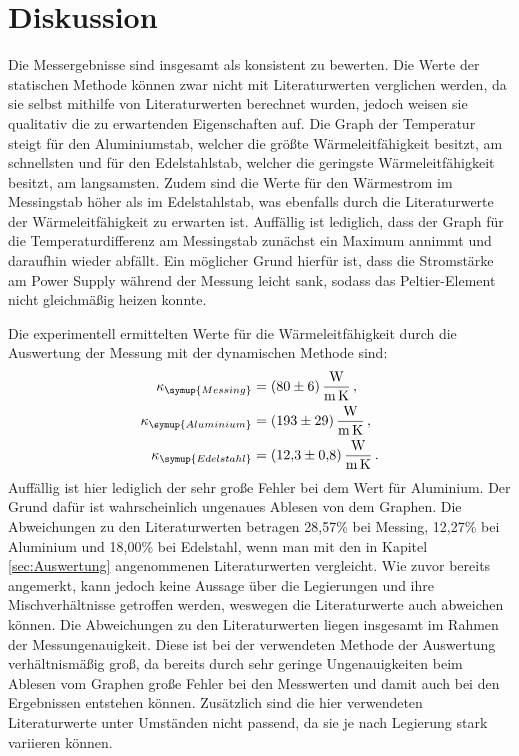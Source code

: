 \section{Diskussion}
\label{sec:Diskussion}
Die Messergebnisse sind insgesamt als konsistent zu bewerten.
Die Werte der statischen Methode können zwar nicht mit Literaturwerten verglichen werden,
da sie selbst mithilfe von Literaturwerten berechnet wurden, jedoch weisen sie
qualitativ die zu erwartenden Eigenschaften auf. Die Graph der Temperatur steigt für
den Aluminiumstab, welcher die größte Wärmeleitfähigkeit besitzt, am schnellsten und
für den Edelstahlstab, welcher die geringste Wärmeleitfähigkeit besitzt, am langsamsten.
Zudem sind die Werte für den Wärmestrom im Messingstab höher als im Edelstahlstab,
was ebenfalls durch die Literaturwerte der Wärmeleitfähigkeit zu erwarten ist.
Auffällig ist lediglich, dass der Graph für die Temperaturdifferenz am Messingstab
zunächst ein Maximum annimmt und daraufhin wieder abfällt. Ein möglicher Grund hierfür
ist, dass die Stromstärke am Power Supply während der Messung leicht sank, sodass
das Peltier-Element nicht gleichmäßig heizen konnte.


Die experimentell ermittelten Werte für die Wärmeleitfähigkeit durch die Auswertung
der Messung mit der dynamischen Methode sind:
\begin{align}
  \kappa_{\symup{Messing}} &= \SI{80(6)}{\watt\per\meter\per\kelvin}\,,\nonumber \\
  \kappa_{\symup{Aluminium}} &= \SI{193(29)}{\watt\per\meter\per\kelvin}\,,\nonumber \\
  \kappa_{\symup{Edelstahl}} &= \SI{12.3(08)}{\watt\per\meter\per\kelvin}\,.\nonumber
\end{align}
Auffällig ist hier lediglich der sehr große Fehler bei dem Wert für Aluminium. Der Grund dafür
ist wahrscheinlich ungenaues Ablesen von dem Graphen.
Die Abweichungen zu den Literaturwerten betragen 28,57\% bei Messing, 12,27\% bei
Aluminium und 18,00\% bei Edelstahl, wenn man mit den in Kapitel \ref{sec:Auswertung} angenommenen
Literaturwerten vergleicht. Wie zuvor bereits angemerkt, kann jedoch keine Aussage
über die Legierungen und ihre Mischverhältnisse getroffen werden, weswegen die Literaturwerte
auch abweichen können.
Die Abweichungen zu den Literaturwerten liegen insgesamt im Rahmen der Messungenauigkeit.
Diese ist bei der verwendeten Methode der Auswertung verhältnismäßig groß, da bereits
durch sehr geringe Ungenauigkeiten beim Ablesen vom Graphen große Fehler bei den
Messwerten und damit auch bei den Ergebnissen entstehen können. Zusätzlich sind die
hier verwendeten Literaturwerte unter Umständen nicht passend, da sie je nach Legierung stark
variieren können.
